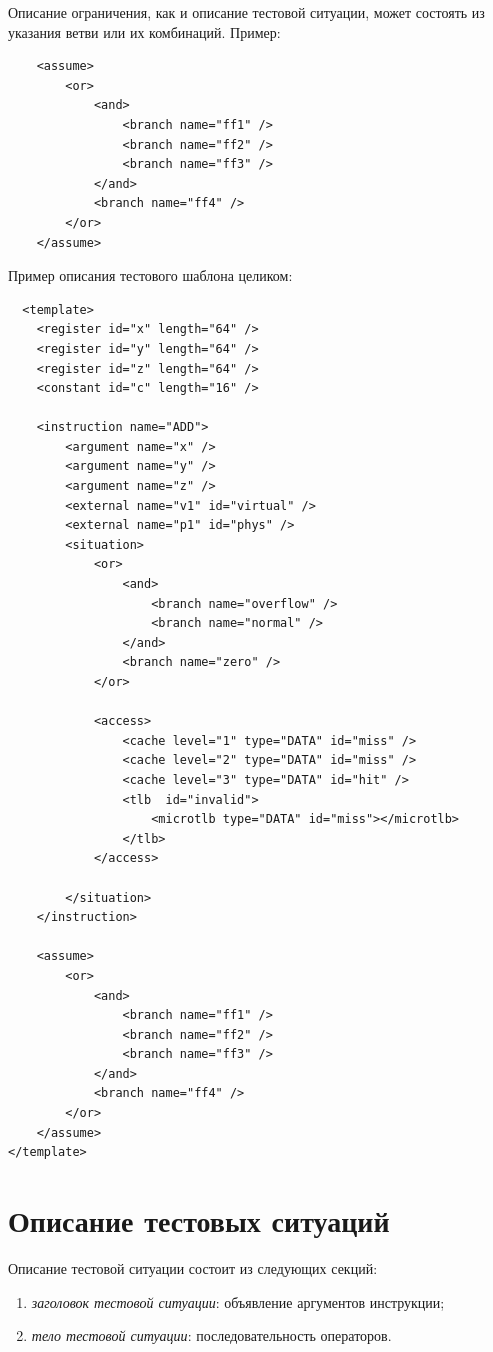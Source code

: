 Описание ограничения, как и описание тестовой ситуации, может
состоять из указания ветви или их комбинаций. Пример: {\small
\begin{verbatim}
    <assume>
        <or>
            <and>
                <branch name="ff1" />
                <branch name="ff2" />
                <branch name="ff3" />
            </and>
            <branch name="ff4" />
        </or>
    </assume>
\end{verbatim}}

Пример описания тестового шаблона целиком: {\small
\begin{verbatim}
  <template>
    <register id="x" length="64" />
    <register id="y" length="64" />
    <register id="z" length="64" />
    <constant id="c" length="16" />

    <instruction name="ADD">
        <argument name="x" />
        <argument name="y" />
        <argument name="z" />
        <external name="v1" id="virtual" />
        <external name="p1" id="phys" />
        <situation>
            <or>
                <and>
                    <branch name="overflow" />
                    <branch name="normal" />
                </and>
                <branch name="zero" />
            </or>

            <access>
                <cache level="1" type="DATA" id="miss" />
                <cache level="2" type="DATA" id="miss" />
                <cache level="3" type="DATA" id="hit" />
                <tlb  id="invalid">
                    <microtlb type="DATA" id="miss"></microtlb>
                </tlb>
            </access>

        </situation>
    </instruction>

    <assume>
        <or>
            <and>
                <branch name="ff1" />
                <branch name="ff2" />
                <branch name="ff3" />
            </and>
            <branch name="ff4" />
        </or>
    </assume>
</template>
\end{verbatim}
 }

\section{Описание тестовых ситуаций}

Описание тестовой ситуации состоит из следующих секций:
\begin{enumerate}
\item \emph{заголовок тестовой ситуации}: объявление аргументов инструкции;
\item \emph{тело тестовой ситуации}: последовательность операторов.
\end{enumerate}

